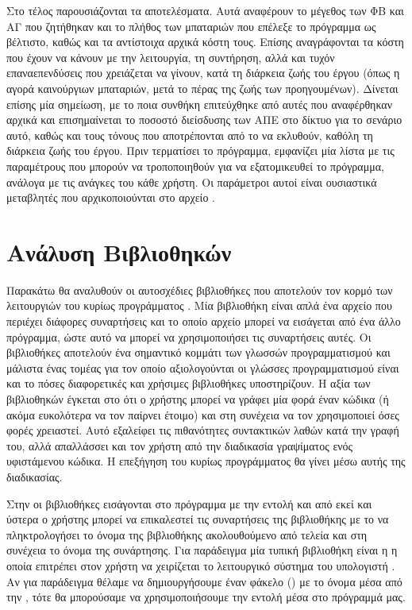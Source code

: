 \documentclass[12pt]{report}
\begin{document}
Στο τέλος παρουσιάζονται τα αποτελέσματα. Αυτά αναφέρουν το μέγεθος των ΦΒ και ΑΓ που ζητήθηκαν και το πλήθος των μπαταριών που επέλεξε το πρόγραμμα ως βέλτιστο, καθώς και τα αντίστοιχα αρχικά κόστη τους. Επίσης αναγράφονται τα κόστη
που έχουν να κάνουν με την λειτουργία, τη συντήρηση, αλλά και τυχόν επαναεπενδύσεις που χρειάζεται να γίνουν, κατά τη διάρκεια ζωής του έργου (όπως η αγορά καινούργιων μπαταριών, μετά το πέρας της ζωής των προηγουμένων). Δίνεται 
επίσης μία σημείωση, με το ποια συνθήκη επιτεύχθηκε από αυτές που αναφέρθηκαν αρχικά και επισημαίνεται το ποσοστό διείσδυσης των ΑΠΕ στο δίκτυο για το σενάριο αυτό, καθώς και τους τόνους {} που αποτρέπονται από το
να εκλυθούν, καθόλη τη διάρκεια ζωής του έργου. Πριν τερματίσει το πρόγραμμα, εμφανίζει μία λίστα με τις παραμέτρους που μπορούν να τροποποιηθούν για να εξατομικευθεί το πρόγραμμα, ανάλογα με τις ανάγκες του κάθε χρήστη. Οι παράμετροι
αυτοί είναι ουσιαστικά μεταβλητές που αρχικοποιούνται στο αρχείο {}.

\section{Ανάλυση Βιβλιοθηκών}
Παρακάτω θα αναλυθούν οι αυτοσχέδιες βιβλιοθήκες που αποτελούν τον κορμό των λειτουργιών του κυρίως προγράμματος {}. Μία βιβλιοθήκη είναι απλά ένα αρχείο {} που περιέχει διάφορες συναρτήσεις 
και το οποίο αρχείο μπορεί να εισάγεται από ένα άλλο πρόγραμμα, ώστε αυτό να μπορεί να χρησιμοποιήσει τις συναρτήσεις αυτές. Οι βιβλιοθήκες αποτελούν ένα σημαντικό κομμάτι των γλωσσών προγραμματισμού και μάλιστα ένας τομέας
για τον οποίο αξιολογούνται οι γλώσσες προγραμματισμού είναι και το πόσες διαφορετικές και χρήσιμες βιβλιοθήκες υποστηρίζουν. Η αξία των βιβλιοθηκών έγκεται στο ότι ο χρήστης
μπορεί να γράφει μία φορά έναν κώδικα (ή ακόμα ευκολότερα να τον παίρνει έτοιμο) και στη συνέχεια να τον χρησιμοποιεί όσες φορές χρειαστεί. Αυτό εξαλείφει τις πιθανότητες συντακτικών λαθών κατά την γραφή του, 
αλλά απαλλάσσει και τον χρήστη από την διαδικασία γραψίματος ενός υφιστάμενου κώδικα. Η επεξήγηση του κυρίως προγράμματος {} θα γίνει μέσω αυτής της διαδικασίας. 

Στην {} οι βιβλιοθήκες εισάγονται στο πρόγραμμα με την εντολή {} και από εκεί και ύστερα ο χρήστης μπορεί να επικαλεστεί τις συναρτήσεις της βιβλιοθήκης με το να πληκτρολογήσει το όνομα της
βιβλιοθήκης ακολουθούμενο από τελεία και στη συνέχεια το όνομα της συνάρτησης. Για παράδειγμα μία τυπική βιβλιοθήκη είναι η {} η οποία επιτρέπει στον χρήστη να χειρίζεται το λειτουργικό σύστημα του υπολογιστή
{}. Αν για παράδειγμα θέλαμε να δημιουργήσουμε έναν φάκελο ({}) με το όνομα {} μέσα από την {}, τότε θα μπορούσαμε να χρησιμοποιήσουμε την 
εντολή {\em{{}}} μέσα στο πρόγραμμά μας. 
\end{document}
